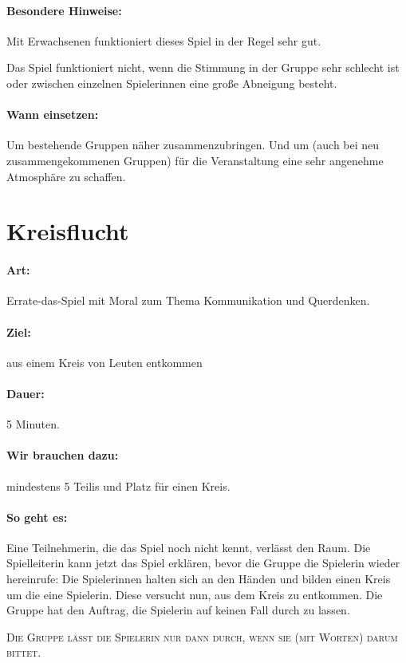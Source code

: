 \paragraph{Besondere Hinweise:} Mit Erwachsenen funktioniert dieses Spiel in der Regel sehr gut.

Das Spiel funktioniert nicht, wenn die Stimmung in der Gruppe sehr schlecht ist oder zwischen einzelnen Spielerinnen eine große Abneigung besteht.
\paragraph{Wann einsetzen:} Um bestehende Gruppen näher zusammenzubringen. Und um (auch bei neu zusammengekommenen Gruppen) für die Veranstaltung eine sehr angenehme Atmosphäre zu schaffen.

\section{Kreisflucht}
\paragraph{Art:} Errate-das-Spiel mit Moral zum Thema Kommunikation und Querdenken.
\paragraph{Ziel:} aus einem Kreis von Leuten entkommen
\paragraph{Dauer:} 5 Minuten.
\paragraph{Wir brauchen dazu:} mindestens 5 Teilis und Platz für einen Kreis.
\paragraph{So geht es:} Eine Teilnehmerin, die das Spiel noch nicht kennt, verlässt den Raum. Die Spielleiterin kann jetzt das Spiel erklären, bevor die Gruppe die Spielerin wieder hereinrufe: Die Spielerinnen halten sich an den Händen und bilden einen Kreis um die eine Spielerin. Diese versucht nun, aus dem Kreis zu entkommen. Die Gruppe hat den Auftrag, die Spielerin auf keinen Fall durch zu lassen.

 \textsc{Die Gruppe lässt die Spielerin nur dann durch, wenn sie (mit Worten) darum bittet.}
